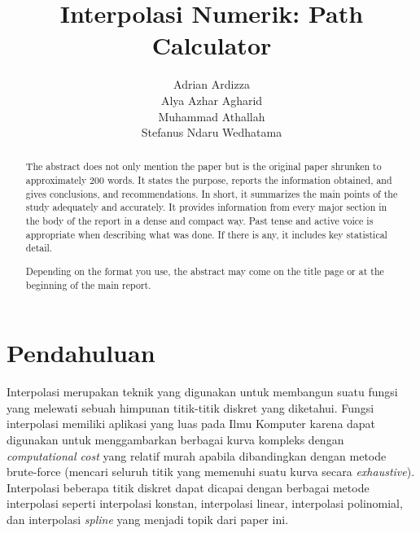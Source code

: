 \documentclass[journal,12pt,onecolumn,a4paper]{IEEEtran}
\begin{document}
\begin{titlepage}
	\title{Interpolasi Numerik: Path Calculator}



	\author{Adrian Ardizza\\
		Alya Azhar Agharid\\
		Muhammad Athallah\\
		Stefanus Ndaru Wedhatama
	}

	\maketitle
	\begin{abstract}
		The abstract does not only mention the paper but is the original paper shrunken to approximately 200 words. It states the purpose, reports the information obtained, and gives conclusions, and recommendations. In short, it summarizes the main points of the study adequately and accurately. It provides information from every major section in the body of the report in a dense and compact way. Past tense and active voice is appropriate when describing what was done. If there is any, it includes key statistical detail.

		Depending on the format you use, the abstract may come on the title page or at the beginning of the main report.

	\end{abstract}
	\tableofcontents
	\listoffigures
	\listoftables
\end{titlepage}

\IEEEpeerreviewmaketitle

\section{Pendahuluan}
Interpolasi merupakan teknik yang digunakan untuk membangun suatu fungsi yang melewati sebuah himpunan titik-titik diskret yang diketahui. Fungsi interpolasi memiliki aplikasi yang luas pada Ilmu Komputer karena dapat digunakan untuk menggambarkan berbagai kurva kompleks dengan \emph{computational cost} yang relatif murah apabila dibandingkan dengan metode brute-force (mencari seluruh titik yang memenuhi suatu kurva secara \emph{exhaustive}). Interpolasi beberapa titik diskret dapat dicapai dengan berbagai metode interpolasi seperti interpolasi konstan, interpolasi linear, interpolasi polinomial, dan interpolasi \emph{spline} yang menjadi topik dari paper ini.
\end{document}
